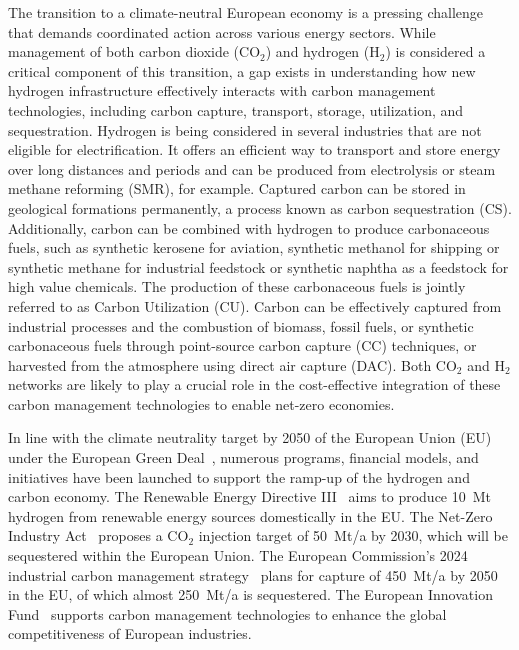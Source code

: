 \documentclass[twocolumn]{article}
\newcommand{\carbon}{CO$_2$}
\newcommand{\hydrogen}{H$_2$}
\begin{document}
The transition to a climate-neutral European economy is a pressing challenge that demands coordinated action across various energy sectors. While management of both carbon dioxide (\carbon{}) and hydrogen (\hydrogen{}) is considered a critical component of this transition, a gap exists in understanding how new hydrogen infrastructure effectively interacts with carbon management technologies, including carbon capture, transport, storage, utilization, and sequestration. Hydrogen is being considered in several industries that are not eligible for electrification. It offers an efficient way to transport and store energy over long distances and periods and can be produced from electrolysis or steam methane reforming (SMR), for example. Captured carbon can be stored in geological formations permanently, a process known as carbon sequestration (CS). Additionally, carbon can be combined with hydrogen to produce carbonaceous fuels, such as synthetic kerosene for aviation, synthetic methanol for shipping or synthetic methane for industrial feedstock or synthetic naphtha as a feedstock for high value chemicals. The production of these carbonaceous fuels is jointly referred to as Carbon Utilization (CU). Carbon can be effectively captured from industrial processes and the combustion of biomass, fossil fuels, or synthetic carbonaceous fuels through point-source carbon capture (CC) techniques, or harvested from the atmosphere using direct air capture (DAC). Both \carbon{} and \hydrogen{} networks are likely to play a crucial role in the cost-effective integration of these carbon management technologies to enable net-zero economies.

In line with the climate neutrality target by 2050 of the European Union (EU) under the European Green Deal~\cite{europeangreendeal}, numerous programs, financial models, and initiatives have been launched to support the ramp-up of the hydrogen and carbon economy. The Renewable Energy Directive III~\cite{DirectiveEU20232023} aims to produce 10~Mt hydrogen from renewable energy sources domestically in the EU. The Net-Zero Industry Act~\cite{eu2023netzero} proposes a \carbon{} injection target of 50~Mt/a by 2030, which will be sequestered within the European Union. The European Commission's 2024 industrial carbon management strategy~\cite{comcms} plans for capture of 450~Mt/a by 2050 in the EU, of which almost 250~Mt/a is sequestered.  The European Innovation Fund~\cite{europeaninnovationfund} supports carbon management technologies to enhance the global competitiveness of European industries.
\end{document}

